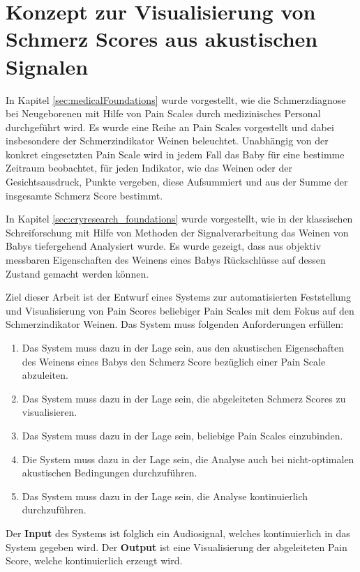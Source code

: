 \chapter{Konzept zur Visualisierung von Schmerz Scores aus akustischen Signalen}

In Kapitel \ref{sec:medicalFoundations} wurde vorgestellt, wie die Schmerzdiagnose bei Neugeborenen mit Hilfe von Pain Scales durch medizinisches Personal durchgeführt wird. Es wurde eine Reihe an Pain Scales vorgestellt und dabei insbesondere der Schmerzindikator \glqq Weinen\grqq{} beleuchtet. Unabhängig von der konkret eingesetzten Pain Scale wird in jedem Fall das Baby für eine bestimme Zeitraum beobachtet, für jeden Indikator, wie das Weinen oder der Gesichtsausdruck, Punkte vergeben, diese Aufsummiert und aus der Summe der insgesamte Schmerz Score bestimmt. 

In Kapitel \ref{sec:cryresearch_foundations} wurde vorgestellt, wie in der klassischen Schreiforschung mit Hilfe von Methoden der Signalverarbeitung das Weinen von Babys tiefergehend Analysiert wurde. Es wurde gezeigt, dass aus objektiv messbaren Eigenschaften des Weinens eines Babys Rückschlüsse auf dessen Zustand gemacht werden können.

Ziel dieser Arbeit ist der Entwurf eines Systems zur automatisierten Feststellung und Visualisierung von Pain Scores beliebiger Pain Scales mit dem Fokus auf den Schmerzindikator \glqq Weinen\grqq. Das System muss folgenden Anforderungen erfüllen:

\begin{enumerate}
	\item Das System muss dazu in der Lage sein, aus den akustischen Eigenschaften des Weinens eines Babys den Schmerz Score bezüglich einer Pain Scale abzuleiten.
	\item Das System muss dazu in der Lage sein, die abgeleiteten Schmerz Scores zu visualisieren.
	\item Das System muss dazu in der Lage sein, beliebige Pain Scales einzubinden. 
	\item Die System muss dazu in der Lage sein, die Analyse auch bei nicht-optimalen akustischen Bedingungen durchzuführen.
	\item Das System muss dazu in der Lage sein, die Analyse kontinuierlich durchzuführen.
\end{enumerate}

Der \textbf{Input} des Systems ist folglich ein Audiosignal, welches kontinuierlich in das System gegeben wird. Der \textbf{Output} ist eine Visualisierung der abgeleiteten Pain Score, welche kontinuierlich erzeugt wird.

